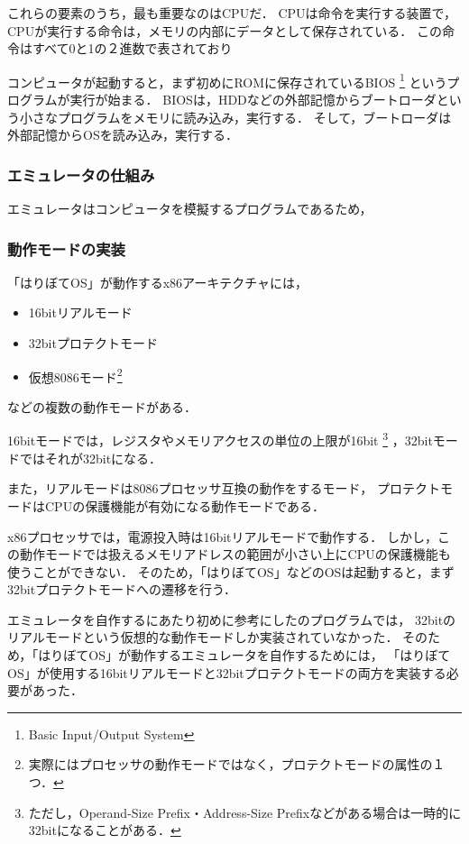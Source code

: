 \documentclass[10pt,a4j]{jsarticle}
\begin{document}
これらの要素のうち，最も重要なのはCPUだ．
CPUは命令を実行する装置で，
CPUが実行する命令は，メモリの内部にデータとして保存されている．
この命令はすべて0と1の２進数で表されており

コンピュータが起動すると，まず初めにROMに保存されているBIOS
\footnote{Basic Input/Output System}
というプログラムが実行が始まる．
BIOSは，HDDなどの外部記憶からブートローダという小さなプログラムをメモリに読み込み，実行する．
そして，ブートローダは外部記憶からOSを読み込み，実行する．

\subsubsection{エミュレータの仕組み}
エミュレータはコンピュータを模擬するプログラムであるため，



\subsubsection{動作モードの実装}
「はりぼてOS」が動作するx86アーキテクチャには，
\begin{itemize}
	\item 16bitリアルモード
	\item 32bitプロテクトモード
	\item 仮想8086モード\footnote{実際にはプロセッサの動作モードではなく，プロテクトモードの属性の１つ．}
\end{itemize}
などの複数の動作モードがある．

16bitモードでは，レジスタやメモリアクセスの単位の上限が16bit
\footnote{ただし，Operand-Size Prefix・Address-Size Prefixなどがある場合は一時的に32bitになることがある．}
，32bitモードではそれが32bitになる．

また，リアルモードは8086プロセッサ互換の動作をするモード，
プロテクトモードはCPUの保護機能が有効になる動作モードである．

x86プロセッサでは，電源投入時は16bitリアルモードで動作する．
しかし，この動作モードでは扱えるメモリアドレスの範囲が小さい上にCPUの保護機能も使うことができない．
そのため，「はりぼてOS」などのOSは起動すると，まず32bitプロテクトモードへの遷移を行う．

エミュレータを自作するにあたり初めに参考にした\cite{learn-x86-by-emu}のプログラムでは，
32bitのリアルモードという仮想的な動作モードしか実装されていなかった．
そのため，「はりぼてOS」が動作するエミュレータを自作するためには，
「はりぼてOS」が使用する16bitリアルモードと32bitプロテクトモードの両方を実装する必要があった．
\end{document}
